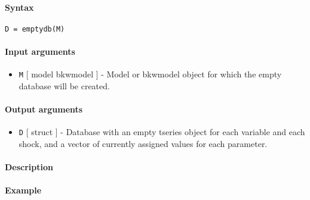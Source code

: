 


	\paragraph{Syntax}\label{syntax}

\begin{verbatim}
D = emptydb(M)
\end{verbatim}

\paragraph{Input arguments}\label{input-arguments}

\begin{itemize}
\itemsep1pt\parskip0pt
\item
  \texttt{M} {[} model \textbar{} bkwmodel {]} - Model or bkwmodel
  object for which the empty database will be created.
\end{itemize}

\paragraph{Output arguments}\label{output-arguments}

\begin{itemize}
\itemsep1pt\parskip0pt
\item
  \texttt{D} {[} struct {]} - Database with an empty tseries object for
  each variable and each shock, and a vector of currently assigned
  values for each parameter.
\end{itemize}

\paragraph{Description}\label{description}

\paragraph{Example}\label{example}


